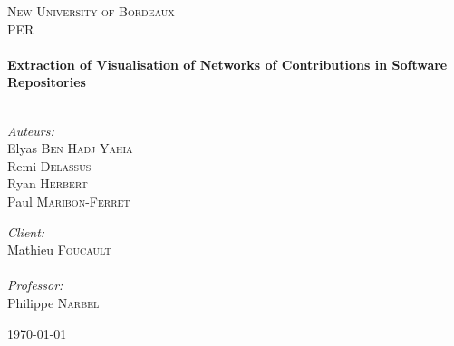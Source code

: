 \begin{titlepage}
\begin{center}


\textsc{\LARGE New University of Bordeaux}\\[1.5cm]

\textsc{\Large {PER}}\\[0.5cm]

\HRule \\[0.4cm]
{ \huge \bfseries Extraction of Visualisation of Networks of Contributions in Software Repositories}\\[0.4cm]

\HRule \\[1.5cm]

\begin{minipage}{0.4\textwidth}
\begin{flushleft} \large
\emph{Auteurs:} \\
Elyas \textsc{Ben Hadj Yahia}\\
Remi \textsc{Delassus}\\
Ryan \textsc{Herbert}\\
Paul \textsc{Maribon-Ferret}\\
\end{flushleft}
\end{minipage}
\begin{minipage}{0.4\textwidth}
\begin{flushright} \large
\emph{Client:} \\
Mathieu \textsc{Foucault}\\
\emph{\\Professor:} \\
Philippe \textsc{Narbel}
\end{flushright}
\end{minipage}

\vfill

{\large \today}

\end{center}
\end{titlepage}
